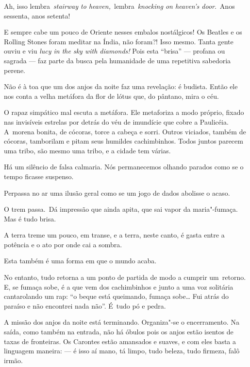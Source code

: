 Ah, isso lembra~\emph{stairway to heaven,}~lembra~\emph{knocking on
heaven's door}.~Anos sessenta, anos setenta!

E sempre cabe um pouco de Oriente nesses embalos nostálgicos! Os Beatles
e os Rolling Stones foram meditar na Índia, não foram?! Isso mesmo.
Tanta gente ouviu e viu \emph{lucy in the sky with diamonds!} Pois esta
``brisa'' --- profana ou sagrada --- faz parte da busca pela humanidade
de uma repetitiva sabedoria perene.

Não é à toa que um dos anjos da noite faz uma revelação: é budista.
Então ele nos conta a velha metáfora da flor de lótus que, do pântano,
mira o céu.

O rapaz simpático mal escuta a metáfora. Ele metaforiza a modo próprio,
fixado nas invisíveis estrelas por detrás do véu de imundície que cobre
a Paulicéia. A~morena bonita, de cócoras, torce a cabeça e sorri. Outros
viciados, também de cócoras, tamborilam e pitam seus humildes
cachimbinhos. Todos juntos parecem uma tribo, são mesmo uma tribo, e a
cidade tem várias.

 

Há um silêncio de falsa calmaria. Nós permanecemos olhando parados como
se o tempo ficasse suspenso.

 

Perpassa no ar uma ilusão geral como se um jogo de dados abolisse o
acaso.

 

O trem passa.~Dá impressão que ainda apita, que sai vapor da
maria"-fumaça. Mas é tudo brisa.

 

A terra treme um pouco, em transe, e a terra, neste canto, é gasta entre
a potência e o ato por onde cai a sombra.

 

Esta também é uma forma em que o mundo acaba.

 

No entanto, tudo retorna a um ponto de partida de modo a cumprir
um~retorno. E, se fumaça sobe, é a que vem dos cachimbinhos e junto a
uma voz solitária cantarolando um rap: ``o beque está queimando, fumaça
sobe… Fui atrás do paraíso e não encontrei nada não''. É~tudo pó e
pedra.

 

A missão dos anjos da noite está terminando. Organiza"-se o encerramento.
Na saída, como também na entrada, não há óbulos pois os anjos estão
isentos de taxas de fronteiras. Os Carontes estão amansados e suaves, e
com eles basta a linguagem maneira: --- é isso aí mano, tá limpo, tudo
beleza, tudo firmeza, falô irmão.

